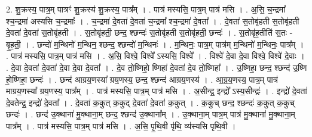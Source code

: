 \documentclass[17pt]{extarticle}
\begin{document}
2. शु॒क्रस्य॒ पात्र॒म् पात्रꣳ॑ शु॒क्रस्य॑ शु॒क्रस्य॒ पात्र᳚म् । . पात्र॑ मस्यसि॒ पात्र॒म् पात्र॑ मसि । . अ॒सि॒ च॒न्द्रमा᳚ श्च॒न्द्रमा॑ अस्यसि च॒न्द्रमाः᳚ । . च॒न्द्रमा॑ दे॒वता॑ दे॒वता॑ च॒न्द्रमा᳚ श्च॒न्द्रमा॑ दे॒वता᳚ । . दे॒वता॑ स॒तोबृ॑हती स॒तोबृ॑हती दे॒वता॑ दे॒वता॑ स॒तोबृ॑हती । . स॒तोबृ॑हती॒ छन्द॒ श्छन्दः॑ स॒तोबृ॑हती स॒तोबृ॑हती॒ छन्दः॑ । . स॒तोबृ॑ह॒तीति॑ स॒तः - बृ॒ह॒ती॒ । . छन्दो॑ म॒न्थिनो॑ म॒न्थिन॒ श्छन्द॒ श्छन्दो॑ म॒न्थिनः॑ । . म॒न्थिनः॒ पात्र॒म् पात्र॑म् म॒न्थिनो॑ म॒न्थिनः॒ पात्र᳚म् । . पात्र॑ मस्यसि॒ पात्र॒म् पात्र॑ मसि । . अ॒सि॒ विश्वे॒ विश्वे᳚ ऽस्यसि॒ विश्वे᳚ । . विश्वे॑ दे॒वा दे॒वा विश्वे॒ विश्वे॑ दे॒वाः । . दे॒वा दे॒वता॑ दे॒वता॑ दे॒वा दे॒वा दे॒वता᳚ । . दे॒व तो॒ष्णिहो॒ ष्णिहा॑ दे॒वता॑ दे॒व तो॒ष्णिहा᳚ । . उ॒ष्णिहा॒ छन्द॒ श्छन्द॑ उ॒ष्णि हो॒ष्णिहा॒ छन्दः॑ । . छन्द॑ आग्रय॒णस्या᳚ ग्रय॒णस्य॒ छन्द॒ श्छन्द॑ आग्रय॒णस्य॑ । . आ॒ग्र॒य॒णस्य॒ पात्र॒म् पात्र॑ माग्रय॒णस्या᳚ ग्रय॒णस्य॒ पात्र᳚म् । . पात्र॑ मस्यसि॒ पात्र॒म् पात्र॑ मसि । . अ॒सीन्द्र॒ इन्द्रो᳚ ऽस्य॒सीन्द्रः॑ । . इन्द्रो॑ दे॒वता॑ दे॒वतेन्द्र॒ इन्द्रो॑ दे॒वता᳚ । . दे॒वता॑ क॒कुत् क॒कुद् दे॒वता॑ दे॒वता॑ क॒कुत् । . क॒कुच् छन्द॒ श्छन्दः॑ क॒कुत् क॒कुच् छन्दः॑ । . छन्द॑ उ॒क्थाना॑ मु॒क्थाना॒म् छन्द॒ श्छन्द॑ उ॒क्थाना᳚म् । . उ॒क्थाना॒म् पात्र॒म् पात्र॑ मु॒क्थाना॑ मु॒क्थाना॒म् पात्र᳚म् । . पात्र॑ मस्यसि॒ पात्र॒म् पात्र॑ मसि । . अ॒सि॒ पृ॒थि॒वी पृ॑थि॒ व्य॑स्यसि पृथि॒वी । \newline
\end{document}
